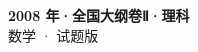 \documentclass[zihao=-4, a4paper]{ctexart}
\begin{document}
\begin{center}
  {\Large\bfseries 2008 年·全国大纲卷Ⅱ·理科}\\[4pt]
  {\large 数学 · 试题版}
\end{center}
\medskip
{}

\end{document}
